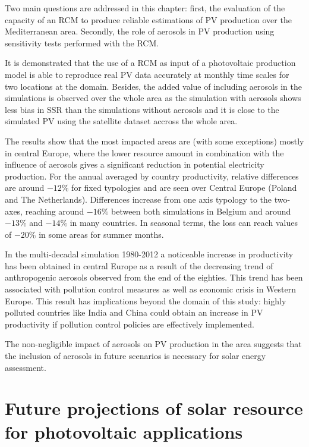 Two main questions are addressed in this chapter: first, the evaluation of the capacity of an RCM to produce reliable estimations of PV production over the Mediterranean area. Secondly, the role of aerosols in PV production using sensitivity tests performed with the RCM. 

It is demonstrated that the use of a RCM as input of a photovoltaic production model is able to reproduce real PV data accurately at monthly time scales for two locations at the domain. Besides, the added value of including aerosols in the simulations is observed over the whole area as the simulation with aerosols shows less bias in SSR than the simulations without aerosols and it is close to the simulated PV using the satellite dataset accross the whole area. 

The results show that the most impacted areas are (with some exceptions) mostly in central Europe, where the lower resource amount in combination with the influence of aerosols gives a significant reduction in potential electricity production. For the annual averaged by country productivity, relative differences are around $-12\%$ for fixed typologies and are seen over Central Europe (Poland and The Netherlands). Differences increase from one axis typology to the two-axes, reaching around $-16\%$ between both simulations in Belgium and around $-13\%$ and $-14\%$ in many countries. In seasonal terms, the loss can reach values of $-20\%$ in some areas for summer months.

In the multi-decadal simulation 1980-2012 a noticeable increase in productivity has been obtained in central Europe as a result of the decreasing trend of anthropogenic aerosols observed from the end of the eighties. This trend has been associated with pollution control measures as well as economic crisis in Western Europe. This result has implications beyond the domain of this study: highly polluted countries like India and China could obtain an increase in PV productivity if pollution control policies are effectively implemented.

The non-negligible impact of aerosols on PV production in the area suggests that the inclusion of aerosols in future scenarios is necessary for solar energy assessment.

\chapter{Future projections of solar resource for photovoltaic applications}

